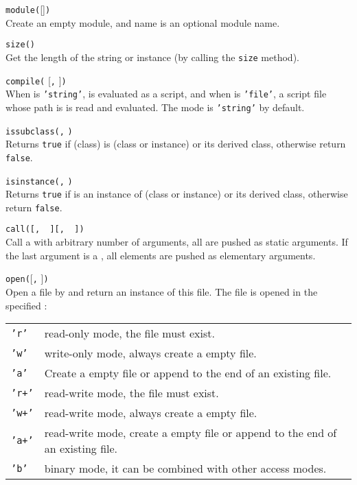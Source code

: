 \hangpar \texttt{module(}[]\texttt{)}\\
Create an empty module, and name is an optional module name.

\hangpar \texttt{size(}\texttt{)}\\
Get the length of the string or instance (by calling the \texttt{size} method).

\hangpar \texttt{compile(} [\texttt{,} ]\texttt{)}\\
When  is \texttt{'string'},  is evaluated as a script, and when  is \texttt{'file'}, a script file whose path is  is read and evaluated. The mode is \texttt{'string'} by default.

\hangpar \texttt{issubclass(}\texttt{,} \texttt{)}\\
Returns \texttt{true} if  (class) is  (class or instance) or its derived class, otherwise return \texttt{false}.

\hangpar \texttt{isinstance(}\texttt{,} \texttt{)}\\
Returns \texttt{true} if  is an instance of  (class or instance) or its derived class, otherwise return \texttt{false}.

\hangpar \texttt{call(}\texttt{[, }\texttt{ ]}\texttt{[, }\texttt{ ]}\texttt{)}\\
Call a  with arbitrary number of arguments, all  are pushed as static arguments. If the last argument is a , all elements are pushed as elementary arguments.

\hangpar \texttt{open(}[\texttt{,} ]\texttt{)}\\
Open a file by  and return an instance of this file. The file is opened in the specified :\\
\begin{tabular}{@{}lp{}}
    \texttt{'r'} & \textsf{read}-only mode, the file must exist. \\
    \texttt{'w'} & \textsf{write}-only mode, always create a empty file. \\
    \texttt{'a'} & Create a empty file or \textsf{append} to the end of an existing file. \\
    \texttt{'r+'} & \textsf{read}-\textsf{write} mode, the file must exist. \\
    \texttt{'w+'} & \textsf{read}-\textsf{write} mode, always create a empty file. \\
    \texttt{'a+'} & \textsf{read}-\textsf{write} mode, create a empty file or \textsf{append} to the end of an existing file. \\
    \texttt{'b'} & \textsf{binary} mode, it can be combined with other access modes. \\
\end{tabular}

